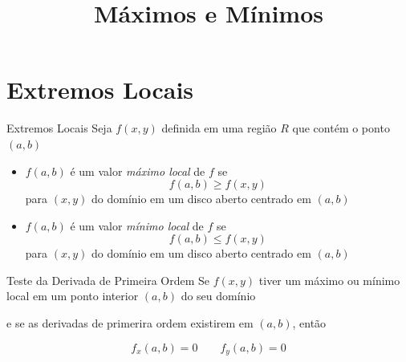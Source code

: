 
\usepackage{calculo_varias_variaveis-1}

\title {Máximos e Mínimos}



\addtitle

\section{Extremos Locais}


\begin{frame}{Extremos Locais}
  Seja $f(x, y)$ definida em uma região $R$ que contém o ponto $(a, b)$

  \pause
  \begin{itemize}[<+->]
    \item \(f(a, b)\) é um valor \emph{máximo local} de $f$ se
          \[
            f(a, b) \geq f(x, y)
          \]
          para \((x, y)\) do domínio em um disco aberto centrado em \((a, b)\)
    \item \(f(a, b)\) é um valor \emph{mínimo local} de $f$ se
          \[
            f(a, b) \leq f(x, y)
          \]
          para \((x, y)\) do domínio em um disco aberto centrado em \((a, b)\)
  \end{itemize}
\end{frame}

\begin{frame}{Teste da Derivada de Primeira Ordem}
  Se $f(x, y)$ tiver um máximo ou mínimo local em um ponto interior \((a, b)\)
  do seu domínio

  \pause
  \vspace{\baselineskip}
  e se as derivadas de primerira ordem existirem em \((a, b)\), então

  \pause
  \vspace{\baselineskip}
  \[
    f_x(a, b) = 0
    \qquad
    f_y(a, b) = 0
  \]
\end{frame}

